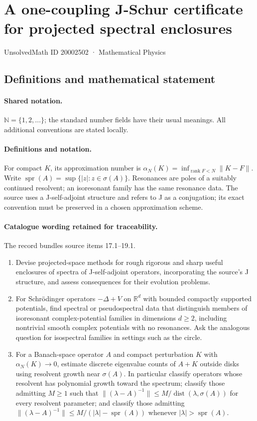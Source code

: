 \documentclass[11pt]{article}
\begin{document}
\setcounter{section}{20002501}
\section{A one-coupling J-Schur certificate for projected spectral enclosures}\label{20002502}
{\small UnsolvedMath ID 20002502 · Mathematical Physics}
\subsection{Definitions and mathematical statement}

\paragraph{Shared notation.}$\mathbb N=\{1,2,\ldots\}$; the standard number fields have their usual meanings. All additional conventions are stated locally.


\paragraph{Definitions and notation.}For compact $K$, its approximation number is $\alpha_N(K)=\inf_{\operatorname{rank}F<N}\|K-F\|$. Write $\operatorname{spr}(A)=\sup\{|z|:z\in\sigma(A)\}$. Resonances are poles of a suitably continued resolvent; an isoresonant family has the same resonance data. The source uses a J-self-adjoint structure and refers to J as a conjugation; its exact convention must be preserved in a chosen approximation scheme.

\paragraph{Catalogue wording retained for traceability.}
The record bundles source items 17.1--19.1.
\begin{enumerate}
\item Devise projected-space methods for rough rigorous and sharp useful enclosures of spectra of J-self-adjoint operators, incorporating the source’s J structure, and assess consequences for their evolution problems.
\item For Schrödinger operators $-\Delta+V$ on $\mathbb R^d$ with bounded compactly supported potentials, find spectral or pseudospectral data that distinguish members of isoresonant complex-potential families in dimensions $d\ge2$, including nontrivial smooth complex potentials with no resonances. Ask the analogous question for isospectral families in settings such as the circle.
\item For a Banach-space operator $A$ and compact perturbation $K$ with $\alpha_N(K)\to0$, estimate discrete eigenvalue counts of $A+K$ outside disks using resolvent growth near $\sigma(A)$. In particular classify operators whose resolvent has polynomial growth toward the spectrum; classify those admitting $M\ge1$ such that $\|(\lambda-A)^{-1}\|\le M/\operatorname{dist}(\lambda,\sigma(A))$ for every resolvent parameter; and classify those admitting $\|(\lambda-A)^{-1}\|\le M/(|\lambda|-\operatorname{spr}(A))$ whenever $|\lambda|>\operatorname{spr}(A)$.
\end{enumerate}
\end{document}
